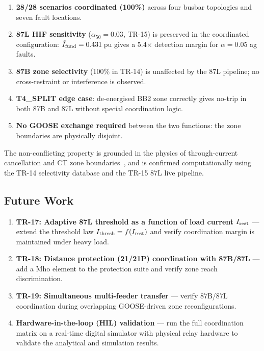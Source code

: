 \documentclass[11pt, a4paper]{article}
\begin{document}
\begin{enumerate}
  \item \textbf{28/28 scenarios coordinated (100\%)} across four busbar
        topologies and seven fault locations.
  \item \textbf{87L HIF sensitivity} ($\alpha_{50}=0.03$, TR-15) is preserved
        in the coordinated configuration: $\hat{I}_{\rm fund}=0.431$\,pu
        gives a 5.4$\times$ detection margin for $\alpha=0.05$ ag faults.
  \item \textbf{87B zone selectivity} (100\% in TR-14) is unaffected by the
        87L pipeline; no cross-restraint or interference is observed.
  \item \textbf{T4\_SPLIT edge case}: de-energised BB2 zone correctly gives
        no-trip in both 87B and 87L without special coordination logic.
  \item \textbf{No GOOSE exchange required} between the two functions:
        the zone boundaries are physically disjoint.
\end{enumerate}

The non-conflicting property is grounded in the physics of through-current
cancellation and CT zone boundaries~\cite{Anderson1999,Blackburn2006}, and
is confirmed computationally using the TR-14 selectivity database and the
TR-15 87L live pipeline.

\subsection{Future Work}

\begin{enumerate}
  \item \textbf{TR-17: Adaptive 87L threshold as a function of load current
        $I_{\rm rest}$} --- extend the threshold law
        $I_{\rm thresh}=f(I_{\rm rest})$ and verify coordination margin
        is maintained under heavy load.
  \item \textbf{TR-18: Distance protection (21/21P) coordination with 87B/87L}
        --- add a Mho element to the protection suite and verify zone
        reach discrimination.
  \item \textbf{TR-19: Simultaneous multi-feeder transfer} --- verify 87B/87L
        coordination during overlapping GOOSE-driven zone reconfigurations.
  \item \textbf{Hardware-in-the-loop (HIL) validation} --- run the full
        coordination matrix on a real-time digital simulator with physical
        relay hardware to validate the analytical and simulation results.
\end{enumerate}




\end{document}
